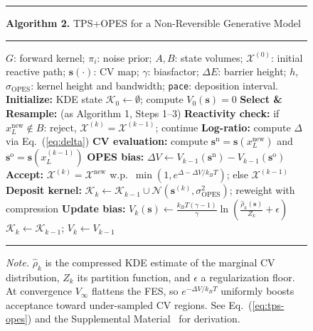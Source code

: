 \documentclass[aps,prl,twocolumn,superscriptaddress,floatfix]{revtex4-2}
\begin{document}
\begin{figure}[t]
\hrule\vspace{2pt}
{\footnotesize\textbf{Algorithm 2.} TPS+OPES for a Non-Reversible Generative Model}
\vspace{1pt}\hrule\vspace{3pt}
\begin{algorithmic}[1]
\footnotesize
\Require $G$: forward kernel; $\pi_i$: noise prior; $A,B$: state volumes;
         $\mathcal{X}^{(0)}$: initial reactive path;
         $\mathbf{s}(\cdot)$: CV map; $\gamma$: biasfactor; $\Delta E$: barrier height;
         $h$, $\sigma_{\mathrm{OPES}}$: kernel height and bandwidth; \texttt{pace}: deposition interval.
\State \textbf{Initialize:} KDE state $\mathcal{K}_0 \leftarrow \emptyset$;\; compute $V_0(\mathbf{s}) = 0$
  \State \textbf{Select \& Resample:} (as Algorithm 1, Steps 1--3)
  \State \textbf{Reactivity check:} if $x_L^{\mathrm{new}}\!\notin\!B$: reject, $\mathcal{X}^{(k)}\!=\!\mathcal{X}^{(k-1)}$; continue
  \State \textbf{Log-ratio:} compute $\Delta$ via Eq.~(\ref{eq:delta})
  \State \textbf{CV evaluation:} compute $\mathbf{s}^{\mathrm{n}} = \mathbf{s}(x_L^{\mathrm{new}})$ and $\mathbf{s}^{\mathrm{o}} = \mathbf{s}(x_L^{(k-1)})$
  \State \textbf{OPES bias:} $\Delta V \leftarrow V_{k-1}(\mathbf{s}^{\mathrm{n}}) - V_{k-1}(\mathbf{s}^{\mathrm{o}})$
  \State \textbf{Accept:} $\mathcal{X}^{(k)}\!=\!\mathcal{X}^{\mathrm{new}}$ w.p.\ $\min\!\left(1, e^{\Delta - \Delta V / k_BT}\right)$; else $\mathcal{X}^{(k-1)}$
    \State \textbf{Deposit kernel:} $\mathcal{K}_k \leftarrow \mathcal{K}_{k-1} \cup \mathcal{N}(\mathbf{s}^{(k)}, \sigma_{\mathrm{OPES}}^2)$;\; reweight with compression
    \State \textbf{Update bias:} $V_k(\mathbf{s}) \leftarrow \frac{k_BT(\gamma-1)}{\gamma}\ln\!\left(\frac{\hat{\rho}_k(\mathbf{s})}{Z_k} + \epsilon\right)$
  \Else
    \State $\mathcal{K}_k \leftarrow \mathcal{K}_{k-1}$;\; $V_k \leftarrow V_{k-1}$
  \EndIf
\EndFor
\end{algorithmic}
\vspace{1pt}\hrule\vspace{2pt}
{\footnotesize\textit{Note.}  $\hat{\rho}_k$ is the compressed KDE estimate of the marginal CV
distribution, $Z_k$ its partition function, and $\epsilon$ a regularization floor.
At convergence $V_\infty$ flattens the FES, so $e^{-\Delta V/k_BT}$ uniformly
boosts acceptance toward under-sampled CV regions.  See Eq.~(\ref{eq:tps-opes})
and the Supplemental Material~\cite{hasyim2025si} for derivation.}
\vspace{1pt}
\label{alg:tps-opes}
\end{figure}
\end{document}
